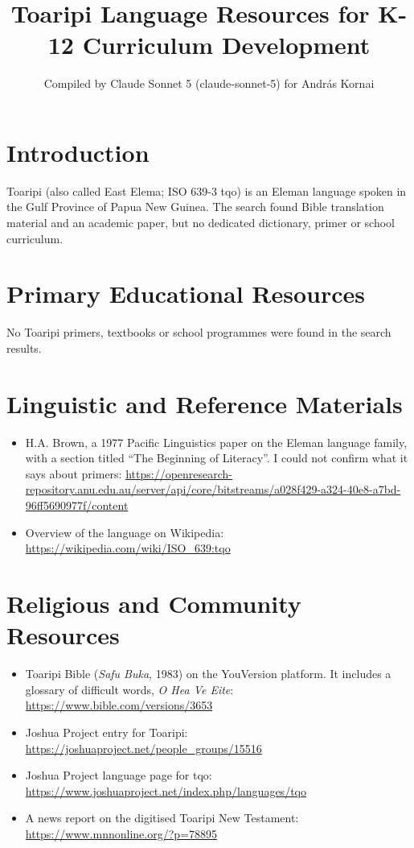 \documentclass[12pt]{article}
\title{Toaripi Language Resources for K-12 Curriculum Development}
\author{Compiled by Claude Sonnet 5 (claude-sonnet-5) for Andr\'as Kornai}
\date{}
\begin{document}
\maketitle

\section{Introduction}
Toaripi (also called East Elema; ISO 639-3 tqo) is an Eleman language spoken in the Gulf Province of Papua New Guinea. The search found Bible translation material and an academic paper, but no dedicated dictionary, primer or school curriculum.

\section{Primary Educational Resources}
No Toaripi primers, textbooks or school programmes were found in the search results.

\section{Linguistic and Reference Materials}
\begin{itemize}
\item H.A. Brown, a 1977 Pacific Linguistics paper on the Eleman language family, with a section titled ``The Beginning of Literacy''. I could not confirm what it says about primers: \url{https://openresearch-repository.anu.edu.au/server/api/core/bitstreams/a028f429-a324-40e8-a7bd-96ff5690977f/content}
\item Overview of the language on Wikipedia: \url{https://wikipedia.com/wiki/ISO_639:tqo}
\end{itemize}

\section{Religious and Community Resources}
\begin{itemize}
\item Toaripi Bible (\emph{Safu Buka}, 1983) on the YouVersion platform. It includes a glossary of difficult words, \emph{O Hea Ve Eite}: \url{https://www.bible.com/versions/3653}
\item Joshua Project entry for Toaripi: \url{https://joshuaproject.net/people_groups/15516}
\item Joshua Project language page for tqo: \url{https://www.joshuaproject.net/index.php/languages/tqo}
\item A news report on the digitised Toaripi New Testament: \url{https://www.mnnonline.org/?p=78895}
\end{itemize}
\end{document}
